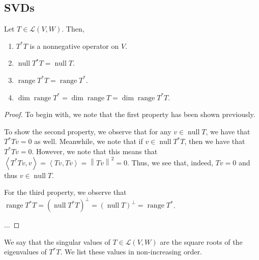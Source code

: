 \documentclass[openany]{book}
\newcommand{\norm}[1]{\left\lVert{#1}\right\rVert}
\DeclareMathOperator*{\vnull}{null}
\DeclareMathOperator*{\vrange}{range}
\newcommand{\innerproduct}[2]{\left\langle{#1}, {#2}\right\rangle}
\begin{document}
\subsection{SVDs}
Let $T \in \mathcal{L}(V,W)$. Then,
\begin{enumerate}
	\item $T^{*}T$ is a nonnegative operator on $V$.
	\item $\vnull T^{*}T = \vnull T$.
	\item $\vrange T^{*}T = \vrange T^{*}$.
	\item $\dim \vrange T^{*} = \dim \vrange T = \dim \vrange T^{*}T$.
\end{enumerate}
\begin{proof}
	To begin with, we note that the first property has been shown previously.
	
	To show the second property, we observe that for any $v \in \vnull T$, we have that $T^{*}Tv = 0$ as well. Meanwhile, we note that if $v \in \vnull T^{*}T$, then we have that $T^{*}Tv = 0$. However, we note that this means that $\innerproduct{T^{*}Tv}{v} = \innerproduct{Tv}{Tv} = \norm{Tv}^{2} = 0$. Thus, we see that, indeed, $Tv = 0$ and thus $v \in \vnull T$.
	
	For the third property, we observe that $\vrange T^{*}T = (\vnull T^{*}T)^{\perp} = (\vnull T)^{\perp} = \vrange T^{*}$.
	
	...
\end{proof}

We say that the singular values of $T \in \mathcal{L}(V,W)$ are the square roots of the eigenvalues of $T^{*}T$. We list these values in non-increasing order.
\end{document}
